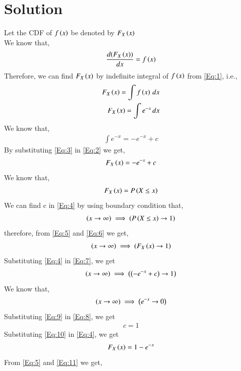\documentclass[journal,12pt,twocolumn]{IEEEtran}
\begin{document}
\section{Solution}
Let the CDF of $f\left(x\right)$ be denoted by $F_X\left(x\right)$ \\
We know that,
\begin{align}
\frac{d(F_X\left(x\right))}{dx} = f\left(x\right) \label{Eq:1}
\end{align}
Therefore, we can find $F_X\left(x\right)$ by indefinite integral of $f\left(x\right)$ from \eqref{Eq:1}, i.e.,
\begin{align}
F_X\left(x\right) = \int f\left(x\right) \,dx \notag \\
F_X\left(x\right) = \int e^{-x} \,dx \label{Eq:2}
\end{align}
We know that,
\begin{align}
\int e^{-x} = -e^{-x} + c \label{Eq:3}
\end{align}
By substituting \eqref{Eq:3} in \eqref{Eq:2} we get,
\begin{align}
F_X\left(x\right) = -e^{-x} + c \label{Eq:4}
\end{align}
We know that,
\begin{align}
F_X\left(x\right) = P\left(X\leq x\right) \label{Eq:5}
\end{align}
We can find c in \eqref{Eq:4} by using boundary condition that,\\
\begin{align}
\left(x \to \infty\right) \implies \left(P\left(X \leq  x\right) \to 1\right) \label{Eq:6}
\end{align}
therefore, from \eqref{Eq:5} and \eqref{Eq:6} we get,
\begin{align}
\left(x \to \infty\right) \implies \left(F_X\left(x\right) \to 1\right) \label{Eq:7}
\end{align}
Substituting \eqref{Eq:4} in \eqref{Eq:7}, we get
\begin{align}
\left(x \to \infty\right) \implies \left(\left(-e^{-x}+c\right) \to 1\right) \label{Eq:8}
\end{align}
We know that,
\begin{align}
\left(x \to \infty\right) \implies \left(e^{-x} \to 0\right) \label{Eq:9}
\end{align}
Substituting \eqref{Eq:9} in \eqref{Eq:8}, we get 
\begin{align}
c=1 \label{Eq:10}
\end{align}
Substituting \eqref{Eq:10} in \eqref{Eq:4}, we get 
\begin{align}
F_X\left(x\right) = 1-e^{-x} \label{Eq:11}
\end{align}
From \eqref{Eq:5} and \eqref{Eq:11} we get,
\end{document}
